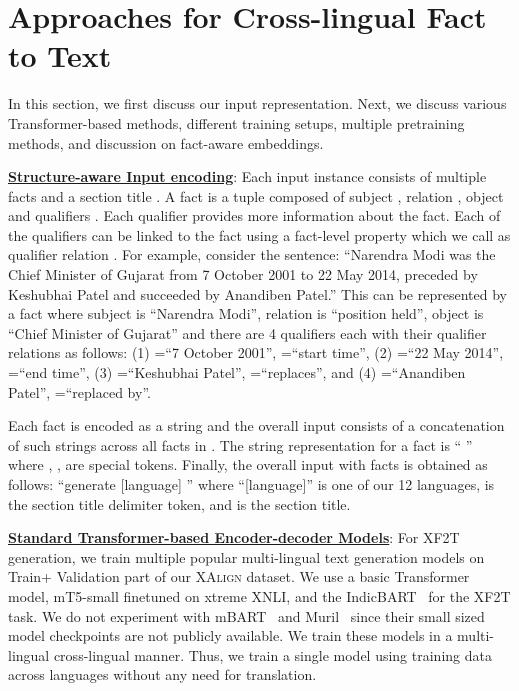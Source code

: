 \documentclass[runningheads]{llncs}
\begin{document}
\section{Approaches for Cross-lingual Fact to Text}
\label{sec:approach}
In this section, we first discuss our input representation. Next, we discuss various Transformer-based methods, different training setups, multiple pretraining methods, and discussion on fact-aware embeddings.

\noindent\underline{\textbf{Structure-aware Input encoding}}: 
Each input instance consists of multiple facts  and a section title . A fact  is a tuple composed of subject , relation , object  and  qualifiers . Each qualifier provides more information about the fact. Each of the qualifiers  can be linked to the fact using a fact-level property which we call as qualifier relation . For example, consider the sentence: ``Narendra Modi was the Chief Minister of Gujarat from 7 October 2001 to 22 May 2014, preceded by Keshubhai Patel and succeeded by Anandiben Patel.'' This can be represented by a fact where subject is ``Narendra Modi'', relation is ``position held'', object is ``Chief Minister of Gujarat'' and there are 4 qualifiers each with their qualifier relations as follows: (1) =``7 October 2001'', =``start time'', (2) =``22 May 2014'', =``end time'', (3) =``Keshubhai Patel'', =``replaces'', and (4) =``Anandiben Patel'', =``replaced by''. 

Each fact  is encoded as a string and the overall input consists of a concatenation of such strings across all facts in . The string representation for a fact  is ``  '' where , ,  are special tokens. Finally, the overall input with  facts is obtained as follows: ``generate [language]     '' where ``[language]'' is one of our 12 languages,  is the section title delimiter token, and  is the section title.











\noindent\underline{\textbf{Standard Transformer-based Encoder-decoder Models}}: For XF2T generation, we train multiple popular multi-lingual text generation models on Train+ Validation part of our \textsc{XAlign} dataset. We use a basic Transformer model, mT5-small finetuned on xtreme XNLI, and the IndicBART~\cite{dabre2021indicbart} for the XF2T task. We do not experiment with mBART~\cite{maurya2021zmbart} and Muril~\cite{khanuja2021muril} since their small sized model checkpoints are not publicly available. We train these models in a multi-lingual cross-lingual manner. Thus, we train a single model using training data across languages without any need for translation. 
\end{document}
